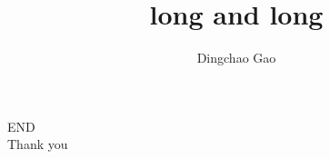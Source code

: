\documentclass[aspectratio=1610]{beamer}
\title[short]{long and long}
\author[Gcc]{Dingchao Gao}
\institute[ISCAS]{Institute of Software Chinese Academy of Sciences}
\begin{document}
\begin{frame}[plain]
  \titlepage
\end{frame}


\begin{frame}
\centering
\Huge{END\\Thank you}
\end{frame}
\end{document}
